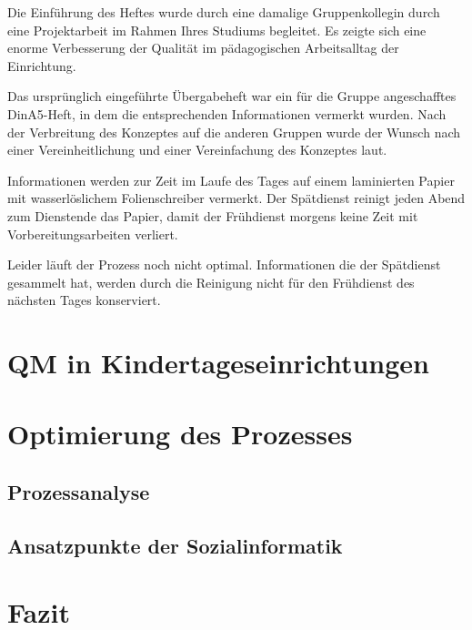Die Einführung des Heftes wurde durch eine damalige Gruppenkollegin durch eine Projektarbeit im Rahmen Ihres Studiums begleitet. Es zeigte sich eine enorme Verbesserung der Qualität im pädagogischen Arbeitsalltag der Einrichtung.

Das ursprünglich eingeführte Übergabeheft war ein für die Gruppe angeschafftes DinA5-Heft, in dem die entsprechenden Informationen vermerkt wurden. Nach der Verbreitung des Konzeptes auf die anderen Gruppen wurde der Wunsch nach einer Vereinheitlichung und einer Vereinfachung des Konzeptes laut.

Informationen werden zur Zeit im Laufe des Tages auf einem laminierten Papier mit wasserlöslichem Folienschreiber vermerkt. Der Spätdienst reinigt jeden Abend zum Dienstende das Papier, damit der Frühdienst morgens keine Zeit mit Vorbereitungsarbeiten verliert.

Leider läuft der Prozess noch nicht optimal. 
Informationen die der Spätdienst gesammelt hat, werden durch die Reinigung nicht für den Frühdienst des nächsten Tages konserviert. 

\section{QM in Kindertageseinrichtungen}

\blindtext


\section{Optimierung des Prozesses}

\subsection{Prozessanalyse}
\blindtext

\subsection{Ansatzpunkte der Sozialinformatik}
\citep[][24]{kreidenweis2012}

\section{Fazit}

\blindtext